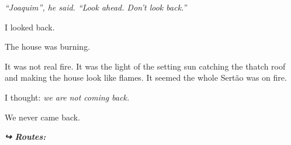 \noindent \textit{\textquotedblleft{}Joaquim\textquotedblright{}\textit{, he said. }\textquotedblleft{}Look ahead. Don't look back.\textquotedblright{}}

\noindent I looked back.

\noindent The house was burning.

\noindent It was not real fire. It was the light of the setting sun catching the thatch roof and making the house look like flames. It seemed the whole Sertão was on fire.

\noindent I thought: \textit{we are not coming back.}

\noindent We never came back.

\vspace{0.5em}
\noindent\textit{\textbf{↪ Routes:}  \rotasep {}}

